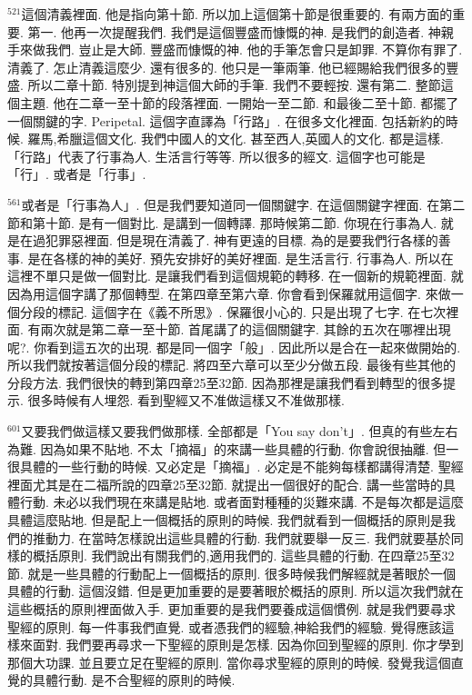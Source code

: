 \documentclass{book}
\begin{document}
$^{521}$這個清義裡面.
他是指向第十節.
所以加上這個第十節是很重要的.
有兩方面的重要.
第一.
他再一次提醒我們.
我們是這個豐盛而慷慨的神.
是我們的創造者.
神親手來做我們.
豈止是大師.
豐盛而慷慨的神.
他的手筆怎會只是卸罪.
不算你有罪了.
清義了.
怎止清義這麼少.
還有很多的.
他只是一筆兩筆.
他已經賜給我們很多的豐盛.
所以二章十節.
特別提到神這個大師的手筆.
我們不要輕按.
還有第二.
整節這個主題.
他在二章一至十節的段落裡面.
一開始一至二節.
和最後二至十節.
都擺了一個關鍵的字.
Peripetal.
這個字直譯為「行路」.
在很多文化裡面.
包括新約的時候.
羅馬,希臘這個文化.
我們中國人的文化.
甚至西人,英國人的文化.
都是這樣.
「行路」代表了行事為人.
生活言行等等.
所以很多的經文.
這個字也可能是「行」.
或者是「行事」.

$^{561}$或者是「行事為人」.
但是我們要知道同一個關鍵字.
在這個關鍵字裡面.
在第二節和第十節.
是有一個對比.
是講到一個轉譯.
那時候第二節.
你現在行事為人.
就是在過犯罪惡裡面.
但是現在清義了.
神有更遠的目標.
為的是要我們行各樣的善事.
是在各樣的神的美好.
預先安排好的美好裡面.
是生活言行.
行事為人.
所以在這裡不單只是做一個對比.
是讓我們看到這個規範的轉移.
在一個新的規範裡面.
就因為用這個字講了那個轉型.
在第四章至第六章.
你會看到保羅就用這個字.
來做一個分段的標記.
這個字在《義不所思》.
保羅很小心的.
只是出現了七字.
在七次裡面.
有兩次就是第二章一至十節.
首尾講了的這個關鍵字.
其餘的五次在哪裡出現呢?.
你看到這五次的出現.
都是同一個字「般」.
因此所以是合在一起來做開始的.
所以我們就按著這個分段的標記.
將四至六章可以至少分做五段.
最後有些其他的分段方法.
我們很快的轉到第四章25至32節.
因為那裡是讓我們看到轉型的很多提示.
很多時候有人埋怨.
看到聖經又不准做這樣又不准做那樣.

$^{601}$又要我們做這樣又要我們做那樣.
全部都是「You say don't」.
但真的有些左右為難.
因為如果不貼地.
不太「摘福」的來講一些具體的行動.
你會說很抽離.
但一很具體的一些行動的時候.
又必定是「摘福」.
必定是不能夠每樣都講得清楚.
聖經裡面尤其是在二福所說的四章25至32節.
就提出一個很好的配合.
講一些當時的具體行動.
未必以我們現在來講是貼地.
或者面對種種的災難來講.
不是每次都是這麼具體這麼貼地.
但是配上一個概括的原則的時候.
我們就看到一個概括的原則是我們的推動力.
在當時怎樣說出這些具體的行動.
我們就要舉一反三.
我們就要基於同樣的概括原則.
我們說出有關我們的,適用我們的.
這些具體的行動.
在四章25至32節.
就是一些具體的行動配上一個概括的原則.
很多時候我們解經就是著眼於一個具體的行動.
這個沒錯.
但是更加重要的是要著眼於概括的原則.
所以這次我們就在這些概括的原則裡面做入手.
更加重要的是我們要養成這個慣例.
就是我們要尋求聖經的原則.
每一件事我們直覺.
或者憑我們的經驗,神給我們的經驗.
覺得應該這樣來面對.
我們要再尋求一下聖經的原則是怎樣.
因為你回到聖經的原則.
你才學到那個大功課.
並且要立足在聖經的原則.
當你尋求聖經的原則的時候.
發覺我這個直覺的具體行動.
是不合聖經的原則的時候.
\end{document}
